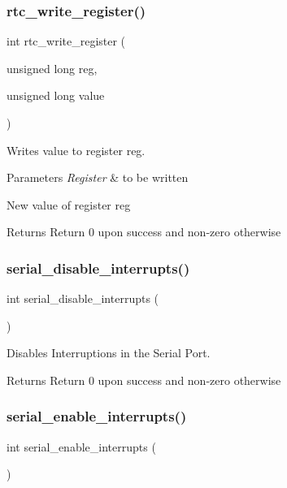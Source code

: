 \subsubsection{\texorpdfstring{rtc\+\_\+write\+\_\+register()}{rtc\_write\_register()}}
{\footnotesize\ttfamily int rtc\+\_\+write\+\_\+register (\begin{DoxyParamCaption}\item[{unsigned long}]{reg,  }\item[{unsigned long}]{value }\end{DoxyParamCaption})}



Writes value to register reg. 


\begin{DoxyParams}{Parameters}
{\em Register} & to be written\\
\hline
\end{DoxyParams}
New value of register reg

\begin{DoxyReturn}{Returns}
Return 0 upon success and non-\/zero otherwise 
\end{DoxyReturn}
\hypertarget{group___serial_gab84b5f47451f228a5c574b77e5c7e9eb}{}\label{group___serial_gab84b5f47451f228a5c574b77e5c7e9eb} 
\subsubsection{\texorpdfstring{serial\+\_\+disable\+\_\+interrupts()}{serial\_disable\_interrupts()}}
{\footnotesize\ttfamily int serial\+\_\+disable\+\_\+interrupts (\begin{DoxyParamCaption}{ }\end{DoxyParamCaption})}



Disables Interruptions in the Serial Port. 

\begin{DoxyReturn}{Returns}
Return 0 upon success and non-\/zero otherwise 
\end{DoxyReturn}
\hypertarget{group___serial_ga06724a3064e96e445257aba1e4f3de46}{}\label{group___serial_ga06724a3064e96e445257aba1e4f3de46} 
\subsubsection{\texorpdfstring{serial\+\_\+enable\+\_\+interrupts()}{serial\_enable\_interrupts()}}
{\footnotesize\ttfamily int serial\+\_\+enable\+\_\+interrupts (\begin{DoxyParamCaption}{ }\end{DoxyParamCaption})}



